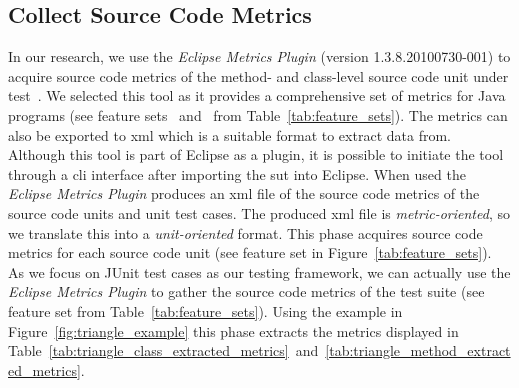 \subsection{Collect Source Code Metrics}
\label{subsec:approach_collect_source_metrics}
In our research, we use the \emph{Eclipse Metrics Plugin} (version 1.3.8.20100730-001) to acquire source code metrics of the method- and class-level source code unit under test~\cite{Metrics}. We selected this tool as it provides a comprehensive set of metrics for Java programs (see feature sets ~and~ from Table~\ref{tab:feature_sets}). The metrics can also be exported to \gls{xml} which is a suitable format to extract data from. Although this tool is part of Eclipse as a plugin, it is possible to initiate the tool through a \gls{cli} interface after importing the \gls{sut} into Eclipse. When used the \emph{Eclipse Metrics Plugin} produces an \gls{xml} file of the source code metrics of the source code units and unit test cases. The produced \gls{xml} file is \emph{metric-oriented}, so we translate this into a \emph{unit-oriented} format. This phase acquires source code metrics for each source code unit (see feature set  in Figure~\ref{tab:feature_sets}). As we focus on JUnit test cases as our testing framework, we can actually use the \emph{Eclipse Metrics Plugin} to gather the source code metrics of the test suite (see feature set  from Table~\ref{tab:feature_sets}). Using the example in Figure~\ref{fig:triangle_example} this phase extracts the metrics displayed in Table~\ref{tab:triangle_class_extracted_metrics}~and~\ref{tab:triangle_method_extracted_metrics}.

